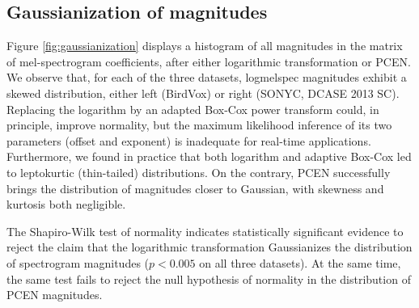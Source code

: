\documentclass[journal]{IEEEtran}
\theoremstyle{remark}
\begin{document}
\subsection{Gaussianization of magnitudes}\label{sub:gaussianization}
Figure \ref{fig:gaussianization} displays a histogram of all magnitudes in the matrix of mel-spectrogram coefficients, after either logarithmic transformation or PCEN.
We observe that, for each of the three datasets, logmelspec magnitudes exhibit a skewed distribution, either left (BirdVox) or right (SONYC, DCASE 2013 SC).
Replacing the logarithm by an adapted Box-Cox power transform \cite{box1964jrss} could, in principle, improve normality, but the maximum likelihood inference of its two parameters (offset and exponent) is inadequate for real-time applications.
Furthermore, we found in practice that both logarithm and adaptive Box-Cox led to leptokurtic (thin-tailed) distributions.
On the contrary, PCEN successfully brings the distribution of magnitudes closer to Gaussian, with skewness and kurtosis both negligible.

The Shapiro-Wilk test of normality indicates statistically significant evidence to reject the claim that the logarithmic transformation Gaussianizes the distribution of spectrogram magnitudes ($p<0.005$ on all three datasets).
At the same time, the same test fails to reject the null hypothesis of normality in the distribution of PCEN magnitudes.
\end{document}

